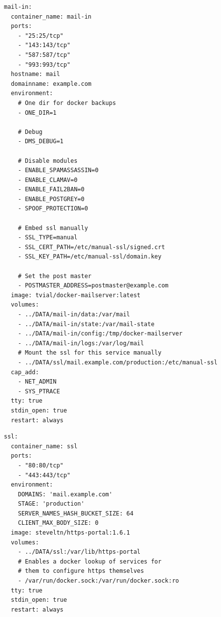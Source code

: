 \documentclass[a4paper,11pt,singlespacing]{article}
\begin{document}
\lstlistoflistings
\begin{lstlisting}[label={lst:Maileingangsserver},caption={Maileingangsserver}]
mail-in:
  container_name: mail-in
  ports:
    - "25:25/tcp"
    - "143:143/tcp"
    - "587:587/tcp"
    - "993:993/tcp"
  hostname: mail
  domainname: example.com
  environment:
    # One dir for docker backups
    - ONE_DIR=1
    
    # Debug
    - DMS_DEBUG=1
    
    # Disable modules
    - ENABLE_SPAMASSASSIN=0
    - ENABLE_CLAMAV=0
    - ENABLE_FAIL2BAN=0
    - ENABLE_POSTGREY=0
    - SPOOF_PROTECTION=0
    
    # Embed ssl manually
    - SSL_TYPE=manual
    - SSL_CERT_PATH=/etc/manual-ssl/signed.crt
    - SSL_KEY_PATH=/etc/manual-ssl/domain.key
    
    # Set the post master
    - POSTMASTER_ADDRESS=postmaster@example.com
  image: tvial/docker-mailserver:latest
  volumes:
    - ../DATA/mail-in/data:/var/mail
    - ../DATA/mail-in/state:/var/mail-state
    - ../DATA/mail-in/config:/tmp/docker-mailserver
    - ../DATA/mail-in/logs:/var/log/mail
    # Mount the ssl for this service manually
    - ../DATA/ssl/mail.example.com/production:/etc/manual-ssl
  cap_add:
    - NET_ADMIN
    - SYS_PTRACE
  tty: true
  stdin_open: true
  restart: always
	\end{lstlisting}
	
\begin{lstlisting}[label={lst:SSL-Container},caption={SSL-Container}]
ssl:
  container_name: ssl
  ports:
    - "80:80/tcp"
    - "443:443/tcp"
  environment:
    DOMAINS: 'mail.example.com'
    STAGE: 'production'
    SERVER_NAMES_HASH_BUCKET_SIZE: 64
    CLIENT_MAX_BODY_SIZE: 0
  image: steveltn/https-portal:1.6.1
  volumes:
    - ../DATA/ssl:/var/lib/https-portal
    # Enables a docker lookup of services for
    # them to configure https themselves
    - /var/run/docker.sock:/var/run/docker.sock:ro
  tty: true
  stdin_open: true
  restart: always
	\end{lstlisting}
	
\end{document}
